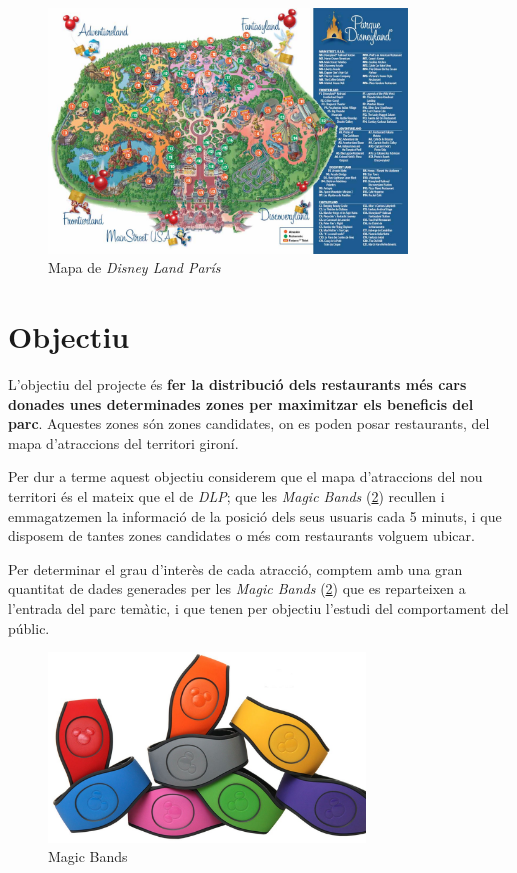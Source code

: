 \documentclass[12pt]{article}
\begin{document}
\begin{figure}[H]
    \centering
    \includegraphics[width=0.85\textwidth]{imatges/mapa_disney_land_paris.jpg}\par\vspace{1cm}
    \caption{Mapa de \textit{Disney Land París}}
    \label{fig:disney1}
\end{figure}

\clearpage
\section{Objectiu}
L'objectiu del projecte és \textbf{fer la distribució dels restaurants més cars donades unes determinades zones per maximitzar els beneficis del parc}. Aquestes zones són zones candidates, on es poden posar restaurants, del mapa d'atraccions del territori gironí.

Per dur a terme aquest objectiu considerem que el mapa d'atraccions del nou territori és el mateix que el de \textit{DLP}; que les \textit{Magic Bands} (\ref{fig:magic_bands}) recullen i emmagatzemen la informació de la posició dels seus usuaris cada 5 minuts, i que disposem de tantes zones candidates o més com restaurants volguem ubicar. 

Per determinar el grau d'interès de cada atracció, comptem amb una gran quantitat de dades generades per les \textit{Magic Bands} (\ref{fig:magic_bands}) que es reparteixen a l'entrada del parc temàtic, i que tenen per objectiu l'estudi del comportament del públic. 

\begin{figure}[H]
    \centering
    \includegraphics[width=0.75\textwidth]{imatges/magic_bands.jpg}\par\vspace{1cm}
    \caption{Magic Bands}
    \label{fig:magic_bands}
\end{figure}
\end{document}
